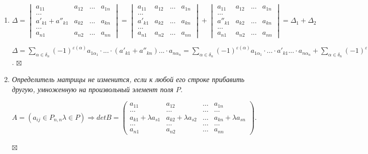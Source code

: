 \documentclass[a4paper, 12pt]{report}
\newenvironment{Proof} %
{\par\noindent{$\blacklozenge$}} %
{\hfill$\scriptstyle\boxtimes$}
\begin{document}
\begin{enumerate}
\begin{cor41_1}
		\end{cor41_1}
		\newtheorem*{cor41_2}{Следствие}\begin{cor41_2} $\forall A \in P_{n,n}: det(\lambda A) = \lambda^n detA$.
		\end{cor41_2}
		\newtheorem*{cor41_3}{Следствие}\begin{cor41_3} Если матрица содержит две пропорциональные строки, то её определитель равен нулю.
		\end{cor41_3}
		\item $\Delta = \begin{vmatrix}
			a_{11}& a_{12} & ... & a_{1n}\\
			... \\
			a'_{k1} + a''_{k1} & a_{k2} & ... &a_{kn}\\
			... \\
			a_{n1} & a_{n2} & ... & a_{nn}
		\end{vmatrix} = \begin{vmatrix}
			a_{11}& a_{12} & ... & a_{1n}\\
			... \\
			a'_{k1} & a_{k2} & ... &a_{kn}\\
			... \\
			a_{n1} & a_{n2} & ... & a_{nn}
		\end{vmatrix} + \begin{vmatrix}
			a_{11}& a_{12} & ... & a_{1n}\\
			... \\
			a''_{k1} & a_{k2} & ... &a_{kn}\\
			... \\
			a_{n1} & a_{n2} & ... & a_{nn}
		\end{vmatrix} = \Delta_1 + \Delta_2$
		\begin{Proof}
			$\Delta = \sum\limits_{\alpha \in \delta_n} (-1)^{\varepsilon(\alpha)}a_{1\alpha_1} \cdot ... \cdot (a'_{k1} + a''_{kn}) ...  \cdot a_{n\alpha_n} = \sum\limits_{\alpha \in \delta_n} (-1)^{\varepsilon(\alpha)}a_{1\alpha_1} \cdot ... \cdot a'_{k1} ...  \cdot a_{n\alpha_n} + \sum\limits_{\alpha \in \delta_n} (-1)^{\varepsilon(\alpha)}a_{1\alpha_1} \cdot ... \cdot a''_{kn} ...  \cdot a_{n\alpha_n} = \Delta_1 + \Delta_2$.
		\end{Proof} 
		\item \textit{Определитель матрицы не изменится, если к любой его строке прибавить другую, умноженную на произвольный элемент поля $P$.}
		\begin{Proof}
			$A = (a_{ij} \in P_{n,n} \lambda \in P) \Rightarrow det B =  \begin{pmatrix}
				a_{11}& a_{12} & \dots & a_{1n}\\
				\dots & \dots & \dots & \dots \\
				a_{k1} + \lambda a_{s1} & a_{k2} + \lambda a_{s2} & \dots &a_{kn} + \lambda a_{sn}\\
				\dots & \dots & \dots & \dots \\
				a_{n1} & a_{n2} & \dots & a_{nn}
			\end{pmatrix}.$
			

\end{Proof}
\end{enumerate}
\end{document}
